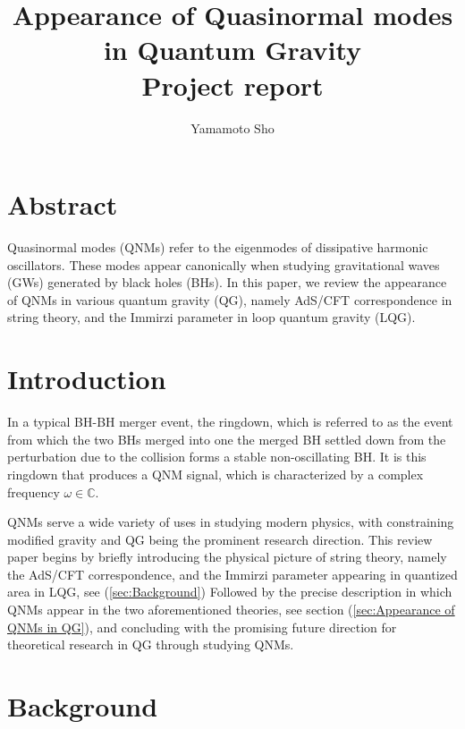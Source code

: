 \documentclass[a4paper, 12pt]{article}
\title{Appearance of Quasinormal modes in Quantum Gravity \\
        \large Project report\\}
\author{Yamamoto Sho}
\begin{document}
\maketitle
\tableofcontents

\section{Abstract}
  Quasinormal modes (QNMs) refer to the eigenmodes of dissipative harmonic
  oscillators. These modes appear canonically when studying
  gravitational waves (GWs) generated by black holes (BHs). In
  this paper, we review the appearance of QNMs in various quantum gravity
  (QG), namely AdS/CFT correspondence in string theory, and the Immirzi
  parameter in loop quantum
  gravity (LQG).
\section{Introduction}

In a typical BH-BH merger event, the ringdown, which is referred to as the event
from which the two BHs merged into one the merged BH settled down from
the perturbation due to the collision forms a stable non-oscillating
BH. It is this ringdown that produces a QNM signal, which is
characterized by a complex frequency $ \omega \in \mathbb{C} $.  

QNMs serve a wide variety of uses in studying modern physics, with constraining
modified gravity and QG being the prominent research
direction\cite{volkel2022constraining}\cite{gogoi2024constraints}. 
This review paper begins by briefly introducing the physical picture
of string theory, namely the AdS/CFT correspondence, and the Immirzi
parameter appearing in quantized
area in LQG, see (\ref{sec:Background}) Followed by the precise description in which QNMs appear in
the two aforementioned theories, see section (\ref{sec:Appearance of QNMs in QG}),
and concluding with the promising future direction for theoretical
research in QG through studying QNMs. 














\section{Background}
\end{document}
